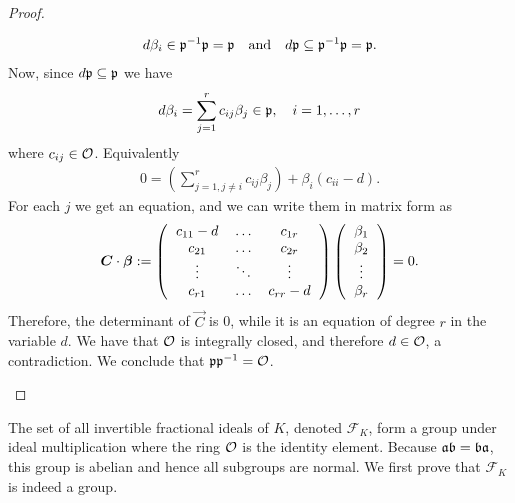 \begin{proof}
\begin{enumerate}
        \begin{align*}
            d\beta_i \in\mathfrak{p}^{-1}\mathfrak{p} = \mathfrak{p} \quad\text{and}\quad d\mathfrak{p} \subseteq \mathfrak{p}^{-1}\mathfrak{p} = \mathfrak{p}.
        \end{align*}
        Now, since \(d\mathfrak{p}\subseteq\mathfrak{p}\) we have
        \begin{align*}
            d\beta_i = \sum\limits_{j = 1}^r c_{ij}\beta_j\in\mathfrak{p},\quad i=1,\dots ,r
        \end{align*}
        where \(c_{ij}\in\mathcal{O}\). Equivalently
        \begin{align*}
            0 = \left(\sum\limits_{j = 1, j \not = i}^r c_{ij}\beta_j\right) + \beta_i(c_{ii} - d).
        \end{align*}
        For each \(j\) we get an equation, and we can write them in matrix form as
        \begin{align}
            \vec{C}\cdot \vec{\beta} := \left(\begin{tabular}{ccc}
                \(c_{11} - d\) & \(\dots\) & \(c_{1r}\) \\
                \(c_{21}\) & \(\dots\) & \(c_{2r}\) \\
                \(\vdots\) & \(\ddots\) & \(\vdots\) \\
                \(c_{r1}\) & \(\dots\) & \(c_{rr} - d\)
            \end{tabular}\right)
            \left(\begin{tabular}{c}
                 \(\beta_1\)  \\
                 \(\beta_2\) \\
                 \(\vdots\) \\
                 \(\beta_r\) 
            \end{tabular}\right) = 0.
            \end{align}
        Therefore, the determinant of \(\vec{C}\) is 0, while it is an equation of degree \(r\) in the variable \(d\). We have that \(\mathcal{O}\) is integrally closed, and therefore \(d\in\mathcal{O}\), a contradiction. We conclude that \(\mathfrak{p}\mathfrak{p}^{-1} = \mathcal{O}\).
    \end{enumerate}
    \end{proof}
    The set of all invertible fractional ideals of \(K\), denoted \(\mathcal{F}_K\), form a group under ideal multiplication where the ring \(\mathcal{O}\) is the identity element. Because \(\mathfrak{a}\mathfrak{b} = \mathfrak{b}\mathfrak{a}\), this group is abelian and hence all subgroups are normal. We first prove that \(\mathcal{F}_K\) is indeed a group.
